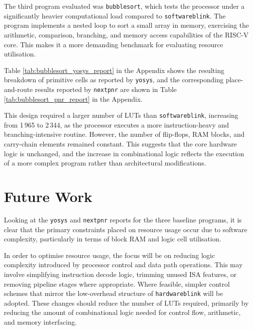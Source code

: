 \documentclass[a4paper,10pt]{article}
\begin{document}
The third program evaluated was \texttt{bubblesort}, 
which tests the processor under a significantly 
heavier computational load compared to \texttt{softwareblink}. 
The program implements a nested loop to sort a small array in memory, 
exercising the arithmetic, comparison, branching, 
and memory access capabilities of the RISC-V core. 
This makes it a more demanding benchmark for 
evaluating resource utilisation.

\iffalse
As with the previous example, 
\texttt{bubblesort.c} was compiled into 
\texttt{program.hex} and \texttt{data.hex}, 
which were loaded into the processor before synthesis. 
\fi
Table \ref{tab:bubblesort_yosys_report} in the Appendix
shows the resulting breakdown of 
primitive cells as reported by \texttt{yosys},
and the corresponding place-and-route results reported by 
\texttt{nextpnr} are shown in 
Table \ref{tab:bubblesort_pnr_report} in the Appendix.

This design required a larger number of LUTs than 
\texttt{softwareblink}, increasing from 1\,965 to 2\,344, 
as the processor executes a more instruction-heavy and 
branching-intensive routine. 
However, the number of flip-flops, RAM blocks, 
and carry-chain elements remained constant. 
This suggests that the core hardware logic is unchanged, 
and the increase in combinational logic reflects 
the execution of a more complex program 
rather than architectural modifications.

\section{Future Work}
\label{sec:Future_Work}

Looking at the \texttt{yosys} and \texttt{nextpnr} reports 
for the three baseline programs, it is clear that the primary constraints 
placed on resource usage occur due to software complexity, 
particularly in terms of block RAM and logic cell utilisation.

In order to optimise resource usage, 
the focus will be on reducing logic complexity introduced by 
processor control and data path operations. 
This may involve simplifying instruction decode logic, 
trimming unused ISA features, or removing pipeline stages where appropriate. 
Where feasible, simpler control schemes that mirror the low-overhead structure of 
\texttt{hardwareblink} will be adopted. 
These changes should reduce the number of LUTs required, 
primarily by reducing the amount of combinational logic needed for control flow, 
arithmetic, and memory interfacing.
\end{document}
